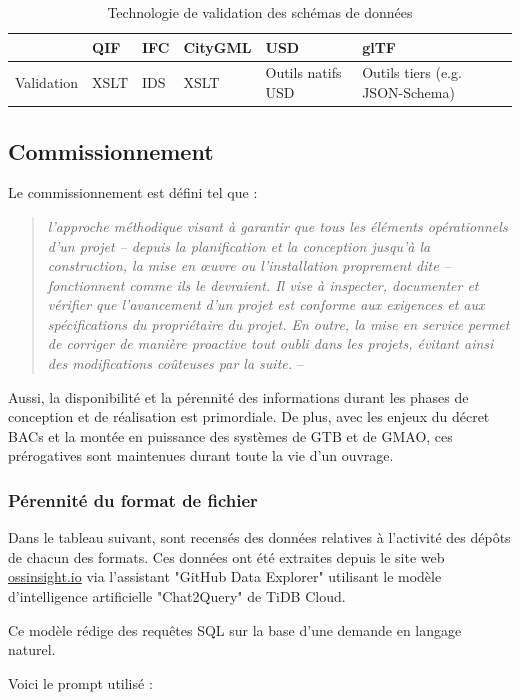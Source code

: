 \documentclass[a4paper,12pt]{article}
\begin{document}
\begin{table}[htbp]
\caption{Technologie de validation des schémas de données}
\centering
\begin{tabular}{llllll}
 & QIF & IFC & CityGML & USD & glTF\\
\hline
Validation & XSLT & IDS & XSLT & Outils natifs USD & Outils tiers (e.g. JSON-Schema)\\
\end{tabular}
\end{table}
\subsection*{Commissionnement}
\label{sec:org183d3b8}
Le commissionnement est défini tel que :
\begin{quote}
\emph{l’approche méthodique visant à garantir que tous les éléments opérationnels d’un projet – depuis la planification et la conception jusqu’à la construction, la mise en œuvre ou l’installation proprement dite – fonctionnent comme ils le devraient. Il vise à inspecter, documenter et vérifier que l’avancement d’un projet est conforme aux exigences et aux spécifications du propriétaire du projet. En outre, la mise en service permet de corriger de manière proactive tout oubli dans les projets, évitant ainsi des modifications coûteuses par la suite.} -- \cite{safetycultureCommissionnementDfinition}
\end{quote}

Aussi, la disponibilité et la pérennité des informations durant les phases de conception et de réalisation est primordiale. De plus, avec les enjeux du décret BACs et la montée en puissance des systèmes de GTB et de GMAO, ces prérogatives sont maintenues durant toute la vie d'un ouvrage. 
\subsubsection*{Pérennité du format de fichier}
\label{sec:org3f58770}

Dans le tableau suivant, sont recensés des données relatives à l'activité des dépôts de chacun des formats. 
Ces données ont été extraites depuis le site web \href{https://ossinsight.io}{ossinsight.io} via l'assistant "GitHub Data Explorer" utilisant le modèle d'intelligence artificielle "Chat2Query" de TiDB Cloud.

Ce modèle rédige des requêtes SQL sur la base d'une demande en langage naturel.

Voici le prompt utilisé : 
\end{document}
